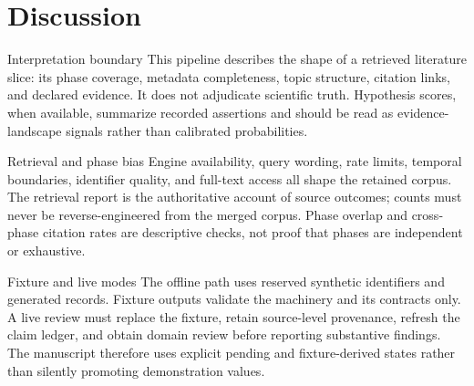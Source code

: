 \documentclass[
  ignorenonframetext,
]{beamer}
\author{}
\date{}
\begin{document}
\section{Discussion}\label{discussion}

\begin{frame}[allowframebreaks]{Interpretation boundary}
\label{interpretation-boundary}
This pipeline describes the shape of a retrieved literature slice: its
phase coverage, metadata completeness, topic structure, citation links,
and declared evidence. It does not adjudicate scientific truth.
Hypothesis scores, when available, summarize recorded assertions and
should be read as evidence-landscape signals rather than calibrated
probabilities.
\end{frame}

\begin{frame}[allowframebreaks]{Retrieval and phase bias}
\label{retrieval-and-phase-bias}
Engine availability, query wording, rate limits, temporal boundaries,
identifier quality, and full-text access all shape the retained corpus.
The retrieval report is the authoritative account of source outcomes;
counts must never be reverse-engineered from the merged corpus. Phase
overlap and cross-phase citation rates are descriptive checks, not proof
that phases are independent or exhaustive.
\end{frame}

\begin{frame}[allowframebreaks]{Fixture and live modes}
\label{fixture-and-live-modes}
The offline path uses reserved synthetic identifiers and generated
records. Fixture outputs validate the machinery and its contracts only.
A live review must replace the fixture, retain source-level provenance,
refresh the claim ledger, and obtain domain review before reporting
substantive findings. The manuscript therefore uses explicit pending and
fixture-derived states rather than silently promoting demonstration
values.
\end{frame}
\end{document}
